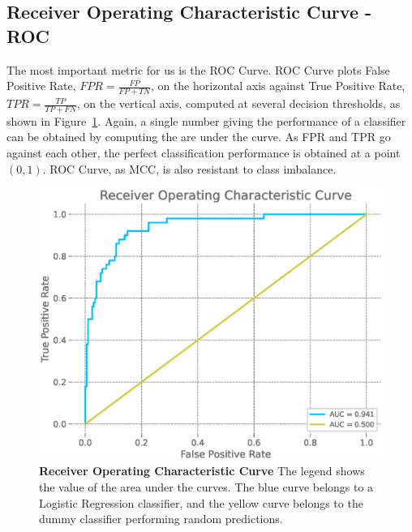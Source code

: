 \subsection{Receiver Operating Characteristic Curve - ROC}
\label{subsection:roc}

The most important metric for us is the ROC Curve. ROC Curve plots False Positive Rate, $FPR =
\frac{FP}{FP + TN}$, on the horizontal axis against True Positive Rate, $TPR = \frac{TP}{TP + FN}$,
on the vertical axis, computed at several decision thresholds, as shown in
Figure~\ref{figure:roc-curve}. Again, a single number giving the performance of a classifier can be
obtained by computing the are under the curve. As FPR and TPR go against each other, the perfect
classification performance is obtained at a point $(0, 1)$. ROC Curve, as MCC, is also resistant to
class imbalance.

\begin{figure}
    \centering
    \includegraphics[width=0.75\linewidth]{figures/roc_curve.eps}
    \caption{
        \textbf{Receiver Operating Characteristic Curve} The legend shows the value of the area
        under the curves. The blue curve belongs to a Logistic Regression classifier, and the
        yellow curve belongs to the dummy classifier performing random predictions.
    }
    \label{figure:roc-curve}
\end{figure}
